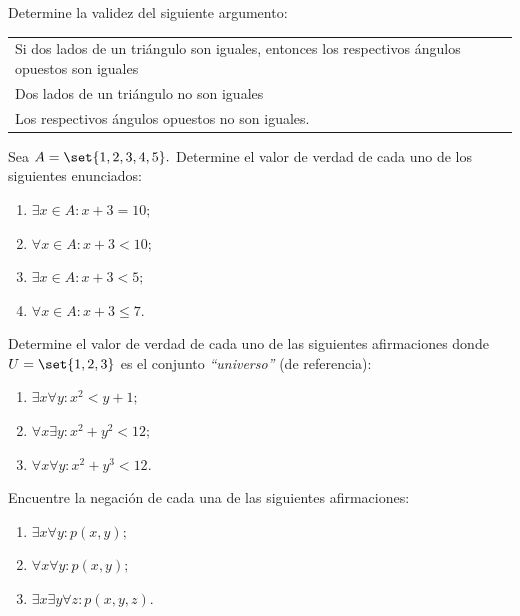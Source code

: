  \begin{problema}
  Determine la validez del siguiente argumento:
  \begin{center}
\begin{tabular}{l}
Si dos lados de un triángulo son iguales, entonces los respectivos ángulos opuestos son iguales\\
Dos lados de un triángulo no son iguales\\\hline
Los respectivos ángulos opuestos no son iguales.
  \end{tabular}
  \end{center}

 \end{problema}





 \begin{problema}
  Sea $A=\set{1,2,3,4,5}.$ Determine el valor de verdad de cada uno de los siguientes enunciados:
  \begin{enumerate}
   \item $\exists x \in A: x+3=10;$ 
   \item $\forall x \in A: x+3<10;$ 
   \item $\exists x \in A: x+3<5;$ 
   \item $\forall x \in A: x+3 \leq 7.$
  \end{enumerate}

 \end{problema}




  \begin{problema}
    Determine el valor de verdad de cada uno de las siguientes afirmaciones donde $U=\set{1,2,3}$ es el conjunto \emph{``universo''} (de referencia):
 \begin{enumerate}
  \item $\exists x \forall y: x^{2}< y+1;$ 
  \item $\forall x \exists y: x^{2}+y^{2}<12;$ 
  \item $\forall x \forall y: x^{2}+y^{3}<12.$
 \end{enumerate}

  \end{problema}




 \begin{problema}
  Encuentre la negación de cada una de las siguientes afirmaciones:
  \begin{enumerate}
   \item $\exists x \forall y: p(x,y);$ 
   \item $\forall x \forall y: p(x,y);$ 
   \item $\exists x \exists y \forall z: p(x,y,z).$
  \end{enumerate}

 \end{problema}




